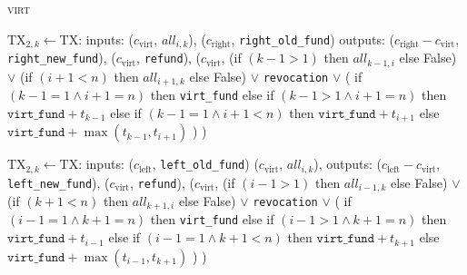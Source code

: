 \begin{center}
\begin{processbox}{\textsc{virt}}
\begin{algorithmic}[1]
         
          \State $\mathrm{TX}_{2, k} \gets \mathrm{TX}$:
          \Indent
            \State inputs:
            \Indent
              \State ($c_{\mathrm{virt}}$, $\mathit{all}_{i, k}$),
              \label{code:virtual-layer:mid-txs:extend-interval-left:virt}
              \State ($c_{\mathrm{right}}$, \texttt{right\_old\_fund})
            \EndIndent
            \State outputs:
            \Indent
              \State ($c_{\mathrm{right}} - c_{\mathrm{virt}}$,
              \texttt{right\_new\_fund}),
              \State ($c_{\mathrm{virt}}$, \texttt{refund}),
              \State ($c_{\mathrm{virt}}$,
              \Indent
                \State (if $(k-1 > 1)$ then $\mathit{all}_{k-1, i}$ else False)
                \State $\vee$ (if $(i+1 < n)$ then $\mathit{all}_{i+1, k}$ else
                False)
                \State $\vee$ \texttt{revocation}
                \State $\vee$ (
                \Indent
                  \State if $(k-1 = 1 \wedge i+1 = n)$ then \texttt{virt\_fund}
                  \State else if $(k-1 > 1 \wedge i+1 = n)$ then
                  $\texttt{virt\_fund} + t_{k-1}$
                  \State else if $(k-1 = 1 \wedge i+1 < n)$ then
                  $\texttt{virt\_fund} + t_{i+1}$
                  \State else 
                  $\texttt{virt\_fund} + \max{(t_{k-1}, t_{i+1})}$
                \EndIndent
                \State )
              \EndIndent
              \State )
            \EndIndent
          \EndIndent
        \EndFor

         
          \State $\mathrm{TX}_{2, k} \gets \mathrm{TX}$:
          \Indent
            \State inputs:
            \Indent
              \State ($c_{\mathrm{left}}$, \texttt{left\_old\_fund})
              \State ($c_{\mathrm{virt}}$, $\mathit{all}_{i, k}$),
            \EndIndent
            \State outputs:
            \Indent
              \State ($c_{\mathrm{left}} - c_{\mathrm{virt}}$,
              \texttt{left\_new\_fund}),
              \label{code:virtual-layer:mid-txs:extend-interval-right:new-fund}
              \State ($c_{\mathrm{virt}}$, \texttt{refund}),
              \State ($c_{\mathrm{virt}}$,
              \Indent
                \State (if $(i-1 > 1)$ then $\mathit{all}_{i-1, k}$ else False)
                \State $\vee$ (if $(k+1 < n)$ then $\mathit{all}_{k+1, i}$ else
                False)
                \State $\vee$ \texttt{revocation}
                \State $\vee$ (
                \Indent
                  \State if $(i-1 = 1 \wedge k+1 = n)$ then \texttt{virt\_fund}
                  \State else if $(i-1 > 1 \wedge k+1 = n)$ then
                  $\texttt{virt\_fund} + t_{i-1}$
                  \State else if $(i-1 = 1 \wedge k+1 < n)$ then
                  $\texttt{virt\_fund} + t_{k+1}$
                  \State else 
                  $\texttt{virt\_fund} + \max{(t_{i-1}, t_{k+1})}$
                \EndIndent
                \State )
              \EndIndent
              \State )
            \EndIndent
          \EndIndent
        \EndFor


\end{algorithmic}
\end{processbox}
\end{center}
